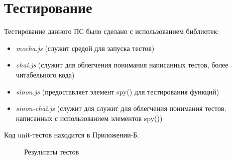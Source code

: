 \documentclass[a4paper,14pt]{extreport}
\begin{document}
\chapter{Тестирование}
\hspace{4ex}Тестирование данного ПС было сделано с использованием библиотек:
\begin{itemize}
	\item \textit{mocha.js} (служит средой для запуска тестов)
	\item \textit{chai.js} (служит для облегчения понимания написанных тестов, более читабельного кода)
	\item \textit{sinon.js} (предоставляет элемент spy() для тестирования функций)
	\item \textit{sinon-chai.js} (служит для служит для облегчения понимания тестов, написанных с использованием элементов spy())
\end{itemize}
\hspace{4ex}Код unit-тестов находится в Приложении-Б.
\begin{figure}[h]
\caption{Результаты тестов}
\label{ris:image}
\end{figure}
\end{document}
